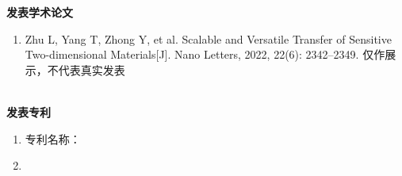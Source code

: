 
\Work

\noindent
\textbf{发表学术论文}
\begin{enumerate}
	\renewcommand{\labelenumi}{[\theenumi]}
	\item Zhu L, Yang T, Zhong Y, et al. Scalable and Versatile Transfer of Sensitive Two-dimensional Materials[J]. Nano Letters, 2022, 22(6): 2342–2349. 仅作展示，不代表真实发表
\end{enumerate}

~\\

\noindent
\textbf{发表专利}
\begin{enumerate}
	\item 专利名称：
	\item 
\end{enumerate}